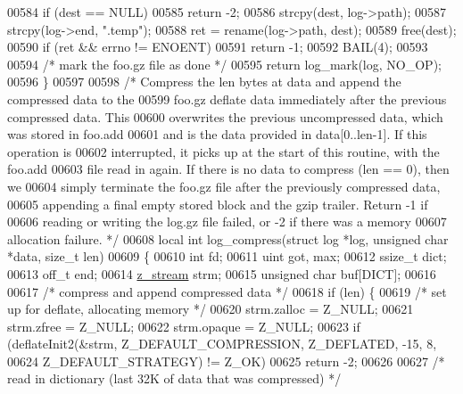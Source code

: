 \begin{DoxyCode}
00584     \textcolor{keywordflow}{if} (dest == NULL)
00585         \textcolor{keywordflow}{return} -2;
00586     strcpy(dest, log->path);
00587     strcpy(log->end, \textcolor{stringliteral}{".temp"});
00588     ret = rename(log->path, dest);
00589     free(dest);
00590     \textcolor{keywordflow}{if} (ret && errno != ENOENT)
00591         \textcolor{keywordflow}{return} -1;
00592     BAIL(4);
00593 
00594     \textcolor{comment}{/* mark the foo.gz file as done */}
00595     \textcolor{keywordflow}{return} log\_mark(log, NO\_OP);
00596 \}
00597 
00598 \textcolor{comment}{/* Compress the len bytes at data and append the compressed data to the}
00599 \textcolor{comment}{   foo.gz deflate data immediately after the previous compressed data.  This}
00600 \textcolor{comment}{   overwrites the previous uncompressed data, which was stored in foo.add}
00601 \textcolor{comment}{   and is the data provided in data[0..len-1].  If this operation is}
00602 \textcolor{comment}{   interrupted, it picks up at the start of this routine, with the foo.add}
00603 \textcolor{comment}{   file read in again.  If there is no data to compress (len == 0), then we}
00604 \textcolor{comment}{   simply terminate the foo.gz file after the previously compressed data,}
00605 \textcolor{comment}{   appending a final empty stored block and the gzip trailer.  Return -1 if}
00606 \textcolor{comment}{   reading or writing the log.gz file failed, or -2 if there was a memory}
00607 \textcolor{comment}{   allocation failure. */}
00608 local \textcolor{keywordtype}{int} log\_compress(\textcolor{keyword}{struct} log *log, \textcolor{keywordtype}{unsigned} \textcolor{keywordtype}{char} *data, \textcolor{keywordtype}{size\_t} len)
00609 \{
00610     \textcolor{keywordtype}{int} fd;
00611     uint got, max;
00612     ssize\_t dict;
00613     off\_t end;
00614     \hyperlink{structz__stream__s}{z\_stream} strm;
00615     \textcolor{keywordtype}{unsigned} \textcolor{keywordtype}{char} buf[DICT];
00616 
00617     \textcolor{comment}{/* compress and append compressed data */}
00618     \textcolor{keywordflow}{if} (len) \{
00619         \textcolor{comment}{/* set up for deflate, allocating memory */}
00620         strm.zalloc = Z\_NULL;
00621         strm.zfree = Z\_NULL;
00622         strm.opaque = Z\_NULL;
00623         \textcolor{keywordflow}{if} (deflateInit2(&strm, Z\_DEFAULT\_COMPRESSION, Z\_DEFLATED, -15, 8,
00624                          Z\_DEFAULT\_STRATEGY) != Z\_OK)
00625             \textcolor{keywordflow}{return} -2;
00626 
00627         \textcolor{comment}{/* read in dictionary (last 32K of data that was compressed) */}

\end{DoxyCode}
